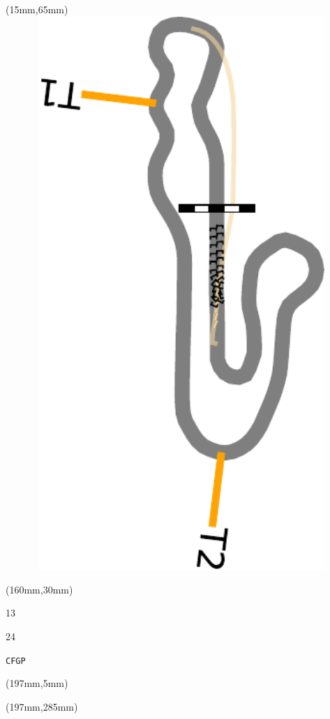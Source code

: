 \begin{textblock*}{185mm}(15mm,65mm)%
\centering
\mbox{\includegraphics[width=185mm,height=210mm,keepaspectratio]{PT/CFGP.pdf}}
\end{textblock*}
\begin{textblock*}{40mm}(160mm,30mm)%
\Large
\par{} 
\par13 
\par24 
\par\hfill\tiny\tt CFGP\\
\end{textblock*}
\begin{textblock*}{20mm}(197mm,5mm)%
\fbox{\thepage}
\label{CFGP}
\end{textblock*}
\begin{textblock*}{20mm}(197mm,285mm)%
\fbox{\thepage}
\end{textblock*}

